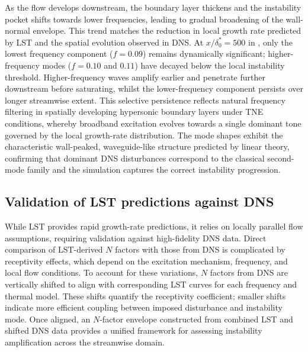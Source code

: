 As the flow develops downstream, the boundary layer thickens and the instability pocket shifts towards lower frequencies, leading to gradual broadening of the wall-normal envelope. This trend matches the reduction in local growth rate predicted by \gls{LST} and the spatial evolution observed in \gls{DNS}. At $x/\delta^{*}_{0} = 500$ in , only the lowest frequency component ($f = 0.09$) remains dynamically significant; higher-frequency modes ($f = 0.10$ and $0.11$) have decayed below the local instability threshold. Higher-frequency waves amplify earlier and penetrate further downstream before saturating, whilst the lower-frequency component persists over longer streamwise extent. This selective persistence reflects natural frequency filtering in spatially developing hypersonic boundary layers under \gls{TNE} conditions, whereby broadband excitation evolves towards a single dominant tone governed by the local growth-rate distribution. The mode shapes exhibit the characteristic wall-peaked, waveguide-like structure predicted by linear theory, confirming that dominant \gls{DNS} disturbances correspond to the classical second-mode family and the simulation captures the correct instability progression.




\subsection{Validation of LST predictions against DNS}
While \gls{LST} provides rapid growth-rate predictions, it relies on locally parallel flow assumptions, requiring validation against high-fidelity \gls{DNS} data. Direct comparison of \gls{LST}-derived $N$ factors with those from \gls{DNS} is complicated by receptivity effects, which depend on the excitation mechanism, frequency, and local flow conditions. To account for these variations, $N$ factors from \gls{DNS} are vertically shifted to align with corresponding \gls{LST} curves for each frequency and thermal model. These shifts quantify the receptivity coefficient; smaller shifts indicate more efficient coupling between imposed disturbance and instability mode. Once aligned, an $N$-factor envelope constructed from combined \gls{LST} and shifted \gls{DNS} data provides a unified framework for assessing instability amplification across the streamwise domain.

